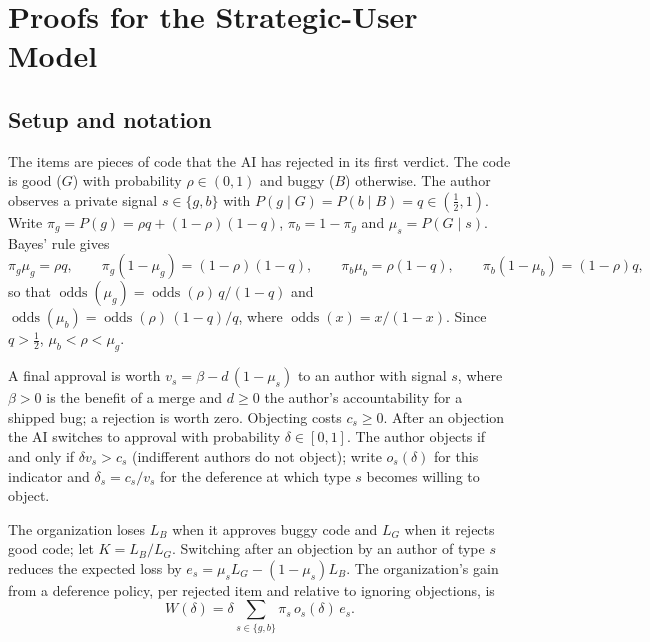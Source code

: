 
\providecommand{\odds}{\operatorname{odds}}
\providecommand{\ind}{\mathbf{1}}

\section{Proofs for the Strategic-User Model}
\label{app:strategic}

\subsection{Setup and notation}

The items are pieces of code that the AI has rejected in its first verdict. The code is good
($G$) with probability $\rho \in (0,1)$ and buggy ($B$) otherwise. The author observes a private
signal $s \in \{g, b\}$ with $P(g \mid G) = P(b \mid B) = q \in (\tfrac12, 1)$. Write
$\pi_g = P(g) = \rho q + (1-\rho)(1-q)$, $\pi_b = 1 - \pi_g$ and $\mu_s = P(G \mid s)$. Bayes' rule gives
\begin{equation}
  \pi_g \mu_g = \rho q, \qquad \pi_g (1-\mu_g) = (1-\rho)(1-q), \qquad
  \pi_b \mu_b = \rho (1-q), \qquad \pi_b (1-\mu_b) = (1-\rho) q,
  \label{eq:bayes}
\end{equation}
so that $\odds(\mu_g) = \odds(\rho)\, q/(1-q)$ and $\odds(\mu_b) = \odds(\rho)\,(1-q)/q$, where
$\odds(x) = x/(1-x)$. Since $q > \tfrac12$, $\mu_b < \rho < \mu_g$.

A final approval is worth $v_s = \beta - d\,(1-\mu_s)$ to an author with signal $s$, where
$\beta > 0$ is the benefit of a merge and $d \ge 0$ the author's accountability for a shipped
bug; a rejection is worth zero. Objecting costs $c_s \ge 0$. After an objection the AI switches
to approval with probability $\delta \in [0,1]$. The author objects if and only if
$\delta v_s > c_s$ (indifferent authors do not object); write $o_s(\delta)$ for this indicator
and $\delta_s = c_s / v_s$ for the deference at which type $s$ becomes willing to object.

The organization loses $L_B$ when it approves buggy code and $L_G$ when it rejects good code;
let $K = L_B / L_G$. Switching after an objection by an author of type $s$ reduces the expected
loss by $e_s = \mu_s L_G - (1-\mu_s) L_B$. The organization's gain from a deference policy,
per rejected item and relative to ignoring objections, is
\begin{equation}
  W(\delta) = \delta \sum_{s \in \{g,b\}} \pi_s\, o_s(\delta)\, e_s .
  \label{eq:gain}
\end{equation}

